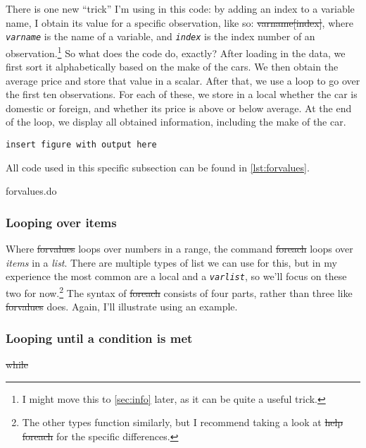There is one new ``trick'' I'm using in this code:
by adding an index to a variable name, I obtain its value for a specific observation,
like so: \st{varname[index]},
where \textit{\texttt{varname}} is the name of a variable,
and \textit{\texttt{index}} is the index number of an observation.\footnote{%
I might move this to \cref{sec:info} later, as it can be quite a useful trick.}
So what does the code do, exactly?
After loading in the data,
we first sort it alphabetically based on the make of the cars.
We then obtain the average price and store that value in a scalar.
After that, we use a loop to go over the first ten observations.
For each of these, we store in a local whether the car is domestic or foreign,
and whether its price is above or below average.
At the end of the loop,
we display all obtained information, including the make of the car.

\begin{center}\texttt{insert figure with output here}\end{center}

All code used in this specific subsection can be found in \cref{lst:forvalues}.

\begin{listing}[tbp]
\caption{forvalues.do}\label{lst:forvalues}
\end{listing}

\subsubsection{Looping over items}

Where \st{forvalues} loops over numbers in a range,
the command \st{foreach} loops over \emph{items} in a \emph{list}.
There are multiple types of list we can use for this,
but in my experience the most common are a local and a \texttt{\textit{varlist}},
so we'll focus on these two for now.\footnote{%
The other types function similarly, but I recommend taking a look at \st{help foreach} for the specific differences.}
The syntax of \st{foreach} consists of four parts,
rather than three like \st{forvalues} does.
Again, I'll illustrate using an example.

%



\subsubsection{Looping until a condition is met}

\st{while}
